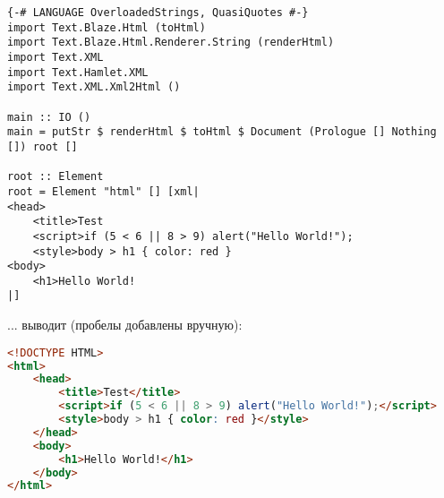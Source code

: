 \begin{lstlisting}
{-# LANGUAGE OverloadedStrings, QuasiQuotes #-}
import Text.Blaze.Html (toHtml)
import Text.Blaze.Html.Renderer.String (renderHtml)
import Text.XML
import Text.Hamlet.XML
import Text.XML.Xml2Html ()

main :: IO ()
main = putStr $ renderHtml $ toHtml $ Document (Prologue [] Nothing []) root []

root :: Element
root = Element "html" [] [xml|
<head>
    <title>Test
    <script>if (5 < 6 || 8 > 9) alert("Hello World!");
    <style>body > h1 { color: red }
<body>
    <h1>Hello World!
|]
\end{lstlisting}%

... выводит (пробелы добавлены вручную):

\begin{lstlisting}[language=HTML]
<!DOCTYPE HTML>
<html>
    <head>
        <title>Test</title>
        <script>if (5 < 6 || 8 > 9) alert("Hello World!");</script>
        <style>body > h1 { color: red }</style>
    </head>
    <body>
        <h1>Hello World!</h1>
    </body>
</html>
\end{lstlisting}%
